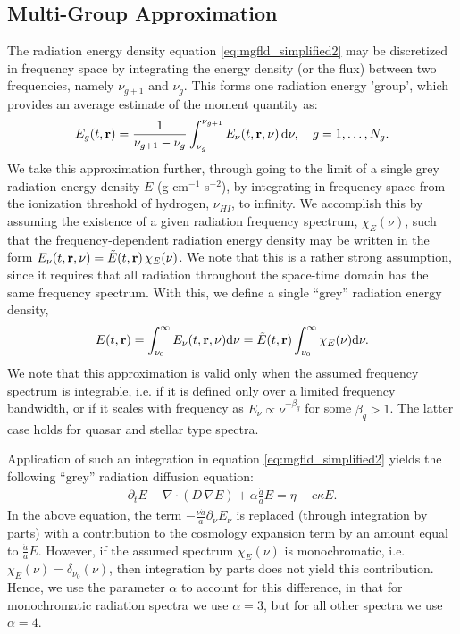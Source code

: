 \documentclass[10pt]{article}
\renewcommand{\(}{\left(}
\renewcommand{\)}{\right)}
\newcommand{\rvec}{{\bf r}}
\newcommand{\adot}{\dot{a}}
\newcommand{\Enu}{E_{\nu}}
\begin{document}
\subsection{Multi-Group Approximation}
\label{subsec:multi_group}

The radiation energy density equation \eqref{eq:mgfld_simplified2} may
be discretized in frequency space by integrating the energy density
(or the flux) between two frequencies, namely $\nu_{g+1}$ and
$\nu_{g}$.  This forms one radiation energy 'group', which provides an
average estimate of the moment quantity as:
\[
   E_{g}(t,\rvec) = \frac{1}{\nu_{g+1}-\nu_{g}} \int_{\nu_{g}}^{\nu_{g+1}}
   \Enu(t,\rvec,\nu)\,\mathrm d\nu, \quad g=1,\ldots,N_g.
\]
We take this approximation further, through going to the limit of a
single grey radiation energy density $E$ (g cm$^{-1}$ s$^{-2}$), by
integrating in frequency space from the ionization threshold of
hydrogen, $\nu_{HI}$, to infinity.  We accomplish this by assuming
the existence of a given radiation frequency spectrum, $\chi_E(\nu)$,
such that the frequency-dependent radiation energy density may be
written in the form $\Enu(t,\rvec,\nu)=\tilde{E}(t,\rvec)\,\chi_E(\nu)$.  
We note that this is a rather strong assumption, since it requires
that all radiation throughout the space-time domain has the same
frequency spectrum.  With this, we define a single ``grey'' radiation
energy density, 
\begin{equation}
\label{eq:grey_definition}
  E(t,\rvec) = \int_{\nu_0}^{\infty} \Enu(t,\rvec,\nu) \mathrm d\nu =
  \tilde{E}(t,\rvec) \int_{\nu_0}^{\infty} \chi_{E}(\nu)\mathrm d\nu.
\end{equation}
We note that this approximation is valid only when the assumed
frequency spectrum is integrable, i.e. if it is defined only over a
limited frequency bandwidth, or if it scales with frequency as
$E_{\nu} \propto \nu^{-\beta_{q}}$ for some $\beta_{q} > 1$.  The
latter case holds for quasar and stellar type spectra. 

Application of such an integration in equation
\eqref{eq:mgfld_simplified2} yields the following ``grey'' 
radiation diffusion equation:
\begin{align}
  \label{eq:mgfld_grey}
  \partial_{t} E - \nabla\cdot\(D\,\nabla E\)
    + \alpha\frac{\adot}{a} E = \eta - c\kappa E.
\end{align}
In the above equation, the term 
$-\frac{\nu \adot}{a}\partial_{\nu}\Enu$ is replaced (through
integration by parts) with a contribution to the cosmology expansion
term by an amount equal to $\frac{\adot}{a} E$.  However, if the
assumed spectrum $\chi_E(\nu)$ is monochromatic, i.e. $\chi_E(\nu) =
\delta_{\nu_0}(\nu)$, then integration by parts does not yield this
contribution.  Hence, we use the parameter $\alpha$ to account for
this difference, in that for monochromatic radiation spectra we use
$\alpha=3$, but for all other spectra we use $\alpha=4$.
\end{document}
